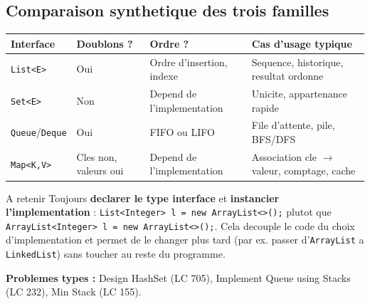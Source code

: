 \documentclass[11pt,a4paper]{article}
\newcommand{\leetcode}[1]{\noindent\textbf{Problemes types :} #1\par\medskip}
\begin{document}
\subsection{Comparaison synthetique des trois familles}

\begin{longtable}{p{2.6cm}p{3.4cm}p{4.2cm}p{4.2cm}}
\toprule
\textbf{Interface} & \textbf{Doublons ?} & \textbf{Ordre ?} & \textbf{Cas d'usage typique} \\
\midrule
\endhead
\texttt{List<E>} & Oui & Ordre d'insertion, indexe & Sequence, historique, resultat ordonne \\
\texttt{Set<E>} & Non & Depend de l'implementation & Unicite, appartenance rapide \\
\texttt{Queue}/\texttt{Deque} & Oui & FIFO ou LIFO & File d'attente, pile, BFS/DFS \\
\texttt{Map<K,V>} & Cles non, valeurs oui & Depend de l'implementation & Association cle $\to$ valeur, comptage, cache \\
\bottomrule
\end{longtable}

\begin{infobox}{A retenir}
Toujours \textbf{declarer le type interface} et \textbf{instancier
l'implementation} : \texttt{List<Integer> l = new ArrayList<>();} plutot que
\texttt{ArrayList<Integer> l = new ArrayList<>();}. Cela decouple le code du
choix d'implementation et permet de le changer plus tard (par ex. passer
d'\texttt{ArrayList} a \texttt{LinkedList}) sans toucher au reste du programme.
\end{infobox}

\leetcode{Design HashSet (LC 705), Implement Queue using Stacks (LC 232), Min Stack (LC 155).}
\end{document}
